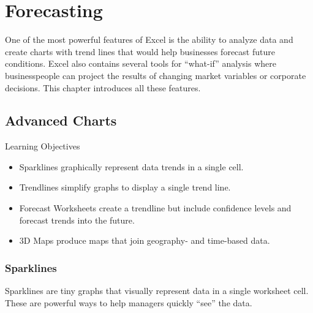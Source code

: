 \chapter{Forecasting}\label{ch08:forecasting}

One of the most powerful features of Excel is the ability to analyze data and create charts with trend lines that would help businesses forecast future conditions. Excel also contains several tools for ``what-if'' analysis where businesspeople can project the results of changing market variables or corporate decisions. This chapter introduces all these features. 

\section{Advanced Charts}

\begin{center}
	\begin{objbox}{Learning Objectives}
		\begin{itemize}
			\setlength{\itemsep}{0pt}
			\setlength{\parskip}{0pt}
			\setlength{\parsep}{0pt}
			
			\item Sparklines graphically represent data trends in a single cell.
			\item Trendlines simplify graphs to display a single trend line.
			\item Forecast Worksheets create a trendline but include confidence levels and forecast trends into the future.
			\item $ 3 $D Maps produce maps that join geography- and time-based data.

		\end{itemize}
	\end{objbox}
\end{center}

\subsection{Sparklines}

Sparklines are tiny graphs that visually represent data in a single worksheet cell. These are powerful ways to help managers quickly ``see'' the data.

